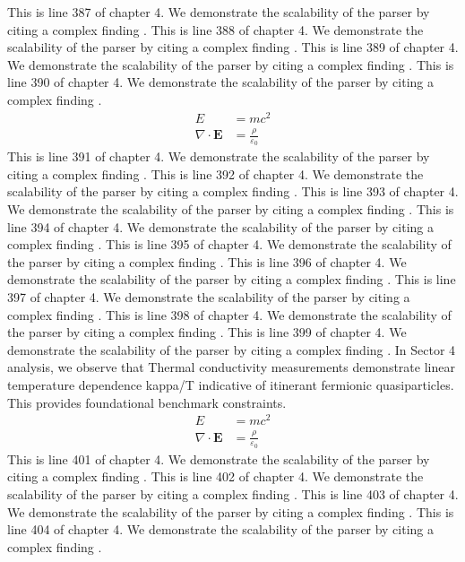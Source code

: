 This is line 387 of chapter 4. We demonstrate the scalability of the parser by citing a complex finding \cite{ref4_387}.
This is line 388 of chapter 4. We demonstrate the scalability of the parser by citing a complex finding \cite{ref4_388}.
This is line 389 of chapter 4. We demonstrate the scalability of the parser by citing a complex finding \cite{ref4_389}.
This is line 390 of chapter 4. We demonstrate the scalability of the parser by citing a complex finding \cite{ref4_390}.
\begin{align*}
  E &= mc^2 \\
  \nabla \cdot \mathbf{E} &= \frac{\rho}{\varepsilon_0}
\end{align*}
This is line 391 of chapter 4. We demonstrate the scalability of the parser by citing a complex finding \cite{ref4_391}.
This is line 392 of chapter 4. We demonstrate the scalability of the parser by citing a complex finding \cite{ref4_392}.
This is line 393 of chapter 4. We demonstrate the scalability of the parser by citing a complex finding \cite{ref4_393}.
This is line 394 of chapter 4. We demonstrate the scalability of the parser by citing a complex finding \cite{ref4_394}.
This is line 395 of chapter 4. We demonstrate the scalability of the parser by citing a complex finding \cite{ref4_395}.
This is line 396 of chapter 4. We demonstrate the scalability of the parser by citing a complex finding \cite{ref4_396}.
This is line 397 of chapter 4. We demonstrate the scalability of the parser by citing a complex finding \cite{ref4_397}.
This is line 398 of chapter 4. We demonstrate the scalability of the parser by citing a complex finding \cite{ref4_398}.
This is line 399 of chapter 4. We demonstrate the scalability of the parser by citing a complex finding \cite{ref4_399}.
In Sector 4 analysis, we observe that Thermal conductivity measurements demonstrate linear temperature dependence kappa/T indicative of itinerant fermionic quasiparticles. This provides foundational benchmark constraints.
\begin{align*}
  E &= mc^2 \\
  \nabla \cdot \mathbf{E} &= \frac{\rho}{\varepsilon_0}
\end{align*}
This is line 401 of chapter 4. We demonstrate the scalability of the parser by citing a complex finding \cite{ref4_401}.
This is line 402 of chapter 4. We demonstrate the scalability of the parser by citing a complex finding \cite{ref4_402}.
This is line 403 of chapter 4. We demonstrate the scalability of the parser by citing a complex finding \cite{ref4_403}.
This is line 404 of chapter 4. We demonstrate the scalability of the parser by citing a complex finding \cite{ref4_404}.
